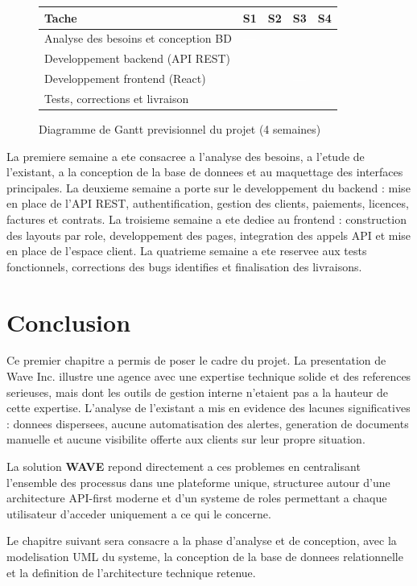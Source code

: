 \documentclass[12pt, a4paper]{report}
\newcommand{\wave}{\textbf{\color{WaveBlue}WAVE}}
\begin{document}
\vspace{0.4cm}
\begin{figure}[H]
\centering
\begin{tabular}{@{}p{5.5cm}cccc@{}}
\toprule
\textbf{Tache} & \textbf{S1} & \textbf{S2} & \textbf{S3} & \textbf{S4} \\
\midrule
Analyse des besoins et conception BD
  & \cellcolor{WaveBlue!60}\textcolor{white}{\textbf{---}}
  & & & \\[6pt]
Developpement backend (API REST)
  & & \cellcolor{WaveBlue!60}\textcolor{white}{\textbf{---}}
  & & \\[6pt]
Developpement frontend (React)
  & & & \cellcolor{WaveBlue!60}\textcolor{white}{\textbf{---}}
  & \\[6pt]
Tests, corrections et livraison
  & & & & \cellcolor{WaveBlue!60}\textcolor{white}{\textbf{---}} \\
\bottomrule
\end{tabular}
\caption{Diagramme de Gantt previsionnel du projet (4 semaines)}
\label{fig:gantt}
\end{figure}

La premiere semaine a ete consacree a l'analyse des besoins, a l'etude de
l'existant, a la conception de la base de donnees et au maquettage des
interfaces principales. La deuxieme semaine a porte sur le developpement du
backend : mise en place de l'API REST, authentification, gestion des clients,
paiements, licences, factures et contrats. La troisieme semaine a ete dediee
au frontend : construction des layouts par role, developpement des pages,
integration des appels API et mise en place de l'espace client. La quatrieme
semaine a ete reservee aux tests fonctionnels, corrections des bugs identifies
et finalisation des livraisons.

\section{Conclusion}

Ce premier chapitre a permis de poser le cadre du projet. La presentation de
Wave Inc. illustre une agence avec une expertise technique solide et des
references serieuses, mais dont les outils de gestion interne n'etaient pas
a la hauteur de cette expertise. L'analyse de l'existant a mis en evidence
des lacunes significatives : donnees dispersees, aucune automatisation des
alertes, generation de documents manuelle et aucune visibilite offerte aux
clients sur leur propre situation.

La solution \wave{} repond directement a ces problemes en centralisant
l'ensemble des processus dans une plateforme unique, structuree autour
d'une architecture API-first moderne et d'un systeme de roles permettant
a chaque utilisateur d'acceder uniquement a ce qui le concerne.

Le chapitre suivant sera consacre a la phase d'analyse et de conception,
avec la modelisation UML du systeme, la conception de la base de donnees
relationnelle et la definition de l'architecture technique retenue.



\end{document}
